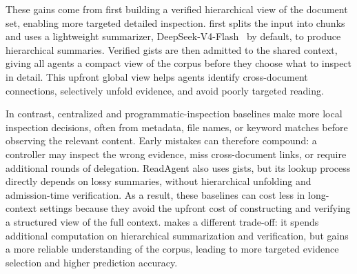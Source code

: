 These gains come from first building a verified hierarchical view of the document set, enabling more targeted detailed inspection. \toolName{} first splits the input into chunks and uses a lightweight summarizer, DeepSeek-V4-Flash~\citep{deepseekai2026deepseekv4} by default, to produce hierarchical summaries. Verified gists are then admitted to the shared context, giving all agents a compact view of the corpus before they choose what to inspect in detail. This upfront global view helps agents identify cross-document connections, selectively unfold evidence, and avoid poorly targeted reading.

In contrast, centralized and programmatic-inspection baselines make more local inspection decisions, often from metadata, file names, or keyword matches before observing the relevant content. Early mistakes can therefore compound: a controller may inspect the wrong evidence, miss cross-document links, or require additional rounds of delegation. ReadAgent also uses gists, but its lookup process directly depends on lossy summaries, without hierarchical unfolding and admission-time verification. As a result, these baselines can cost less in long-context settings because they avoid the upfront cost of constructing and verifying a structured view of the full context. \toolName{} makes a different trade-off: it spends additional computation on hierarchical summarization and verification, but gains a more reliable understanding of the corpus, leading to more targeted evidence selection and higher prediction accuracy.


